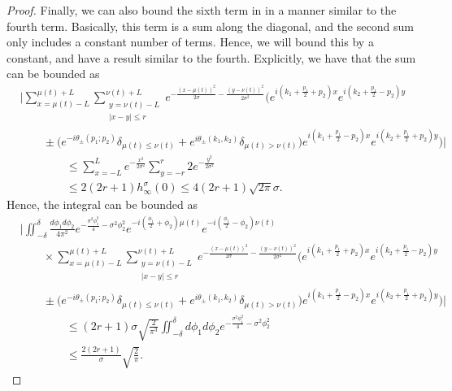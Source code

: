 \documentclass[../thesis-main/thesis-main]{subfiles}
\begin{document}
\begin{proof}

Finally, we can also bound the sixth term in  in a manner similar to the fourth term.  Basically, this term is a sum along the diagonal, and the second sum only includes a constant number of terms.  Hence, we will bound this by a constant, and have a result similar to the fourth.  Explicitly, we have that the sum can be bounded as
\begin{align}
  &\Bigg| \sum_{x=\mu(t)-L}^{\mu(t)+L} \sum_{\substack{y=\nu(t)-L\\|x-y|\leq r}}^{\nu(t)+L} e^{-\frac{(x-\mu(t))^2}{2\sigma} - \frac{(y-\nu(t))^2}{2\sigma^2}}\bigg( e^{i (k_1 + \frac{p_1}{2} + p_2)x}e^{i(k_2 + \frac{p_1}{2} - p_2)y} \nonumber\\
  &\qquad \pm \Big(e^{-i\theta_{\pm}(p_1;p_2)}\delta_{\mu(t)\leq\nu(t)} + e^{i  \theta_{\pm}(k_1,k_2)}\delta_{\mu(t) > \nu(t)}\Big) e^{i (k_1 + \frac{p_1}{2} - p_2)x}e^{i(k_2 + \frac{p_1}{2} + p_2)y}\bigg)\Bigg|\nonumber\\
  &\qquad \qquad \leq \sum_{x=-L}^{L} e^{-\frac{x^2}{2\sigma^2}} \sum_{y=-r}^r 2 e^{-\frac{y^2}{2\sigma^2}}\\
  &\qquad \qquad \leq 2(2r+1) h_{\infty}^\sigma(0) \leq 4(2r+1) \sqrt{2\pi} \sigma.
\end{align}
Hence, the integral can be bounded as
\begin{align}
  &\Bigg|\iint_{-\delta}^\delta \frac{ d\phi_1 d\phi_2}{4\pi^2} e^{ - \frac{\sigma^2\phi_1^2}{4} - \sigma^2 \phi_2^2} e^{-i (\frac{\phi_1}{2} + \phi_2)\mu(t)}e^{-i(\frac{\phi_1}{2} - \phi_2)\nu(t)}\nonumber\\
  &\qquad \times \sum_{x=\mu(t)-L}^{\mu(t)+L} \sum_{\substack{y=\nu(t)-L\\|x-y|\leq r}}^{\nu(t)+L} e^{-\frac{(x-\mu(t))^2}{2\sigma} - \frac{(y-\nu(t))^2}{2\sigma^2}}\bigg( e^{i (k_1 + \frac{p_1}{2} + p_2)x}e^{i(k_2 + \frac{p_1}{2} - p_2)y} \nonumber\\
  &\qquad \pm \Big(e^{-i\theta_{\pm}(p_1;p_2)}\delta_{\mu(t)\leq\nu(t)} + e^{i  \theta_{\pm}(k_1,k_2)}\delta_{\mu(t) > \nu(t)}\Big) e^{i (k_1 + \frac{p_1}{2} - p_2)x}e^{i(k_2 + \frac{p_1}{2} + p_2)y}\bigg)\Bigg|\\
  &\qquad \qquad \leq (2r+1)\sigma \sqrt{\frac{2}{\pi^3}} \iint_{-\delta}^\delta d\phi_1 d\phi_2 e^{ - \frac{\sigma^2\phi_1^2}{4} - \sigma^2 \phi_2^2} \\
  &\qquad \qquad \leq \frac{2(2r+1)}{\sigma} \sqrt{\frac{2}{\pi}}.
\end{align}



\end{proof}
\end{document}
